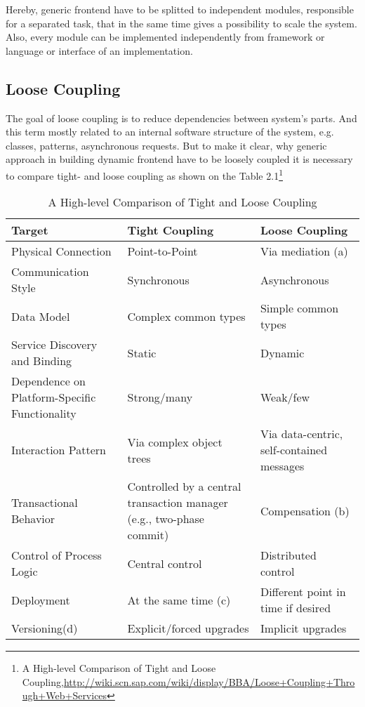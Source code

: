 Hereby, generic frontend have to be splitted to independent modules, responsible for a separated task, that in the same time gives a possibility to scale the system. Also, every module can be implemented independently from framework or language or interface of an implementation. 

\subsection {Loose Coupling}
The goal of loose coupling is to reduce dependencies between system's parts. And this term mostly related to an internal software structure of the system, e.g. classes, patterns, asynchronous requests. But to make it clear, why generic approach in building dynamic frontend have to be loosely coupled it is necessary to compare tight- and loose coupling as shown on the Table 2.1\footnote{A High-level Comparison of Tight and Loose Coupling,\url{http://wiki.scn.sap.com/wiki/display/BBA/Loose+Coupling+Through+Web+Services}}
\begin{table}[H]
	\centering
	\begin{tabular}{|L{3cm}|L{5cm}|l|}
	\hline
	Target 			      & \textbf{Tight Coupling} & \textbf{Loose Coupling} \\
	\hline
	\hline
	Physical Connection		         & Point-to-Point & Via mediation (a)  \\
	\hline
	Communication Style		         & Synchronous & Asynchronous  \\
	\hline
	Data Model		                 & Complex common types & Simple common types  \\
	\hline
	Service Discovery and Binding    & Static & Dynamic  \\
	\hline
	Dependence on Platform-Specific Functionality		& Strong/many & Weak/few  \\
	\hline
	Interaction Pattern		         & Via complex object trees & Via data-centric, self-contained messages  \\
	\hline
	Transactional Behavior		    & Controlled by a central transaction manager (e.g., two-phase commit) & Compensation (b)  \\
	\hline
	Control of Process Logic		& Central control & Distributed control  \\
	\hline
	Deployment	                    & At the same time (c) & Different point in time if desired  \\
	\hline 		
	Versioning(d) 		            & Explicit/forced upgrades & Implicit upgrades  \\
	\hline 
	\end{tabular}
	\caption[A High-level Comparison of Tight and Loose Coupling]{A High-level Comparison of Tight and Loose Coupling}
	\label{tab:loose_coupling}
	\end{table}
